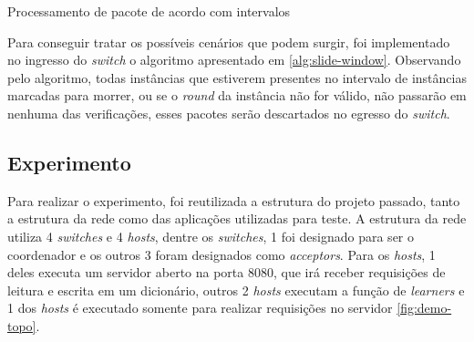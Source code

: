 \documentclass[
    12pt,
    openright, 
    oneside,
    a4paper,
    french,
    english,
    brazil
    ]{facom-ufu-abntex2}
\theoremstyle{definition}
\begin{document}
\begin{algorithm}[H]
\label{alg:slide-window}
\caption{Processamento de pacote de acordo com intervalos}
\SetAlgoLined
{}
\end{algorithm}

Para conseguir tratar os possíveis cenários que podem surgir, foi implementado no ingresso do \emph{switch} o algoritmo
apresentado em \ref{alg:slide-window}. Observando pelo algoritmo, todas instâncias que estiverem presentes no intervalo de 
instâncias marcadas para morrer, ou se o \emph{round} da instância não for válido, não passarão em nenhuma das verificações, esses 
pacotes serão descartados no egresso do \emph{switch}.


\subsection{Experimento}
Para realizar o experimento, foi reutilizada a estrutura do projeto passado, tanto a estrutura da rede como das 
aplicações utilizadas para teste. A estrutura da rede utiliza 4 \emph{switches} e 4 \emph{hosts},
dentre os \emph{switches}, 1 foi designado para ser o coordenador e os outros 3 foram designados como \emph{acceptors}.
Para os \emph{hosts}, 1 deles executa um servidor aberto na porta 8080, que irá receber requisições de leitura
e escrita em um dicionário, outros 2 \emph{hosts} executam a função de \emph{learners} e 1 dos \emph{hosts} é executado
somente para realizar requisições no servidor \ref{fig:demo-topo}.
\end{document}

